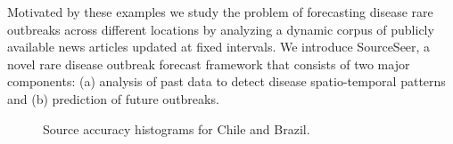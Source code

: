 \documentclass[twoside,leqno,twocolumn]{article}
\newcommand{\fullmodel}{{{\sf SourceSeer}}\xspace}
\begin{document}
Motivated by these examples we study the problem of forecasting disease rare outbreaks across different locations by analyzing a dynamic corpus of publicly available news articles updated at fixed intervals. We introduce \fullmodel, a novel rare disease outbreak forecast framework that consists of two major components: (a) analysis of past data to detect disease spatio-temporal patterns and (b) prediction of future outbreaks. 
\begin{figure}[h]
\captionsetup{font=small}
\begin{center}
\end{center}
\vspace{-20pt}
\caption{Source accuracy histograms for Chile and Brazil.}
\vspace{-10pt}
\label{fig:src_char}
\end{figure}
\end{document}
